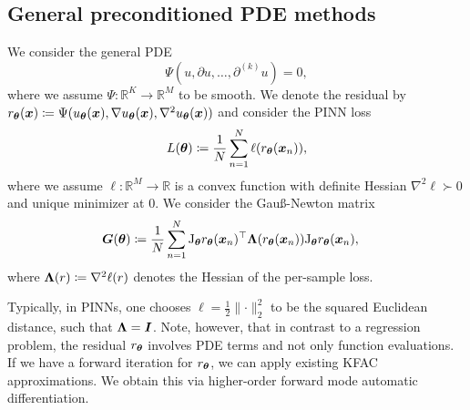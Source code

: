 \subsection{General preconditioned PDE methods}
We consider the general %
PDE
\begin{equation}
    \Psi(u, \partial u, \dots, \partial^{(k)} u) = 0,
\end{equation}
where we assume $\Psi\colon \mathbb R^{K}\to\mathbb R^M$ to be smooth.
We denote the residual by $r_\vtheta(\vx)\coloneqq \Psi(u_\vtheta(\vx), \nabla u_\vtheta(\vx), \nabla^{2} u_\vtheta(\vx))%
$ %
and consider the PINN loss
\begin{equation}
    L({\bm{\theta}})\coloneqq \frac1N\sum_{n=1}^N \ell(r_{{\bm{\theta}}}({\bm{x}}_n)),
\end{equation}
where we assume $\ell\colon\mathbb R^M\to\mathbb R$ is a convex function with definite Hessian $\nabla^2\ell\succ0$ and unique minimizer at $0$.
We consider the Gauß-Newton matrix
\begin{align}
    {\bm{G}}({\bm{\theta}}) & \coloneqq \frac1N\sum_{n=1}^N \mathrm{J}_{\bm{\theta}} r_{\bm{\theta}}({\bm{x}}_n)^\top {\bm{\Lambda}}(r_{\bm{\theta}}({\bm{x}}_n)) \mathrm{J}_{\bm{\theta}} r_{\bm{\theta}}({\bm{x}}_n),
\end{align}
where ${\bm{\Lambda}}(r)\coloneqq \nabla^2 \ell(r)$ denotes the Hessian of the per-sample loss. %

Typically, in PINNs, one chooses $\ell = \frac12\lVert \cdot \rVert_2^2$ to be the squared Euclidean distance, such that ${\bm{\Lambda}} = {\bm{I}}$.
Note, however, that in contrast to a regression problem, the residual $r_{\bm{\theta}}$ involves PDE terms and not only function evaluations.
If we have a forward iteration for $r_{\bm{\theta}}$, we can apply existing KFAC approximations.
We obtain this via higher-order forward mode automatic differentiation.

